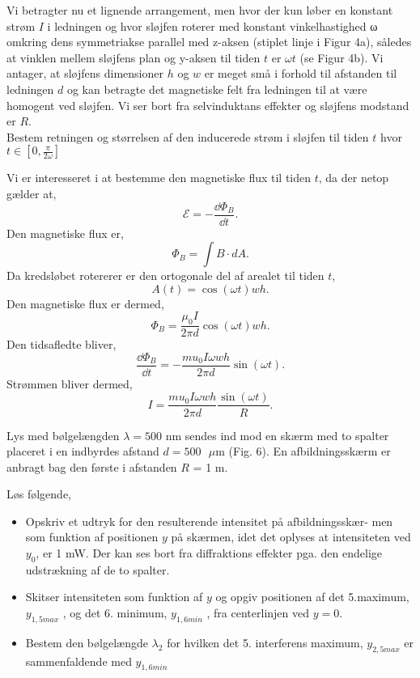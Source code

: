 \begin{subexercise}[b]
Vi betragter nu et lignende arrangement, men hvor der kun løber en konstant
strøm $I$ i ledningen og hvor sløjfen roterer med konstant vinkelhastighed ω
omkring dens symmetriakse parallel med z-aksen (stiplet linje i Figur 4a),
således at vinklen mellem sløjfens plan og y-aksen til tiden $t$ er $\omega t$ (se
Figur 4b). Vi antager, at sløjfens dimensioner $h$ og $w$ er meget små i forhold
til afstanden til ledningen $d$ og kan betragte det magnetiske felt fra ledningen
til at være homogent ved sløjfen. Vi ser bort fra selvinduktans effekter og
sløjfens modstand er $R$. \\
Bestem retningen og størrelsen af den inducerede strøm i sløjfen til tiden $t$ hvor $t\in \left[ 0, \frac{\pi}{2\omega} \right] $
\end{subexercise}
\begin{solution}
Vi er interesseret i at bestemme den magnetiske flux til tiden $t$, da der netop gælder at,
 \[
\mathcal{E} = -\frac{\dd \Phi_B}{\dd t}
.\]
Den magnetiske flux er,
\[
\Phi_B = \int B\cdot dA
.\]
Da kredsløbet rotererer er den ortogonale del af arealet til tiden $t$,
\[
A\left( t \right) = \cos\left( \omega t \right) wh
.\]
Den magnetiske flux er dermed,
\[
\Phi_B = \frac{\mu_0 I}{2\pi d} \cos\left( \omega t \right) wh
.\] 
Den tidsafledte bliver,
\[
	\frac{\dd \Phi_B}{\dd t} = -\frac{mu_0 I\omega w h}{2\pi d}\sin \left( \omega t \right)
.\] 
Strømmen bliver dermed,
\[
I= \frac{mu_0 I\omega w h}{2\pi d}\frac{\sin \left( \omega t \right) }{R}
.\] 
\end{solution}
\begin{exercise}[Opgave 6]
Lys med bølgelængden $\lambda = 500 \text{ nm}$ sendes ind mod en skærm med to spalter
placeret i en indbyrdes afstand $d = 500 \text{ $\mu $m}$ (Fig. 6). En afbildningsskærm
er anbragt bag den første i afstanden $R$ = 1 m.
\end{exercise}
\begin{figure}[ht]
    \centering
    \label{fig:opgave6}
\end{figure}
\begin{subexercise}[a]
	Løs følgende,
	\begin{itemize}
		\item Opskriv et udtryk for den resulterende intensitet på afbildningsskær-
men som funktion af positionen $y$ på skærmen, idet det oplyses at
intensiteten ved $y_0$, er 1 mW. Der kan ses bort fra diffraktions
effekter pga. den endelige udstrækning af de to spalter.
		\item  Skitser intensiteten som funktion af $y$ og opgiv positionen af det 5.maximum, $y_{1,5max}$ , og det 6. minimum, $y_{1,6min}$ , fra centerlinjen ved $y=0$.
		\item Bestem den bølgelængde $\lambda_2$ for hvilken det 5. interferens maximum, $y_{2,5max}$ er sammenfaldende med $y _{1,6min}$
	\end{itemize}

\end{subexercise}
